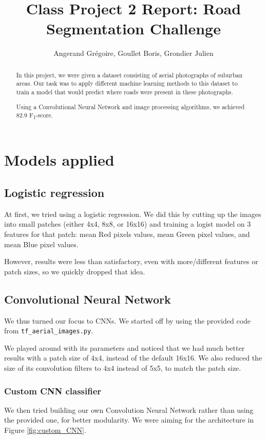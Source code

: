 \documentclass[11pt,conference,compsocconf]{IEEEtran}
\begin{document}
\title{Class Project 2 Report: Road Segmentation Challenge}

\author{
  Angerand Gr\'egoire, Goullet Boris, Grondier Julien 
}

\maketitle

\begin{abstract}
In this project, we were given a dataset consisting of aerial photographs of suburban areas. Our task was to apply different machine learning methods to this dataset to train a model that would predict where roads were present in these photographs.

Using a Convolutional Neural Network and image processing algorithms, we achieved 82.9 F\textsubscript{1}-score.
\end{abstract}


\section{Models applied}

\subsection{Logistic regression}
At first, we tried using a logistic regression. We did this by cutting up the images into small patches (either 4x4, 8x8, or 16x16) and training a logist model on 3 features for that patch: mean Red pixels values, mean Green pixel values, and mean Blue pixel values.

However, results were less than satisfactory, even with more/different features or patch sizes, so we quickly dropped that idea.

\subsection{Convolutional Neural Network}
We thus turned our focus to CNNs. We started off by using the provided code from \texttt{tf\_aerial\_images.py}.

We played around with its parameters and noticed that we had much better results with a patch size of 4x4, instead of the default 16x16. We also reduced the size of its convolution filters to 4x4 instead of 5x5, to match the patch size.

\subsubsection*{Custom CNN classifier}
We then tried building our own Convolution Neural Network rather than using the provided one, for better modularity. We were aiming for the architecture in Figure \ref{fig:custom_CNN}.
\end{document}
